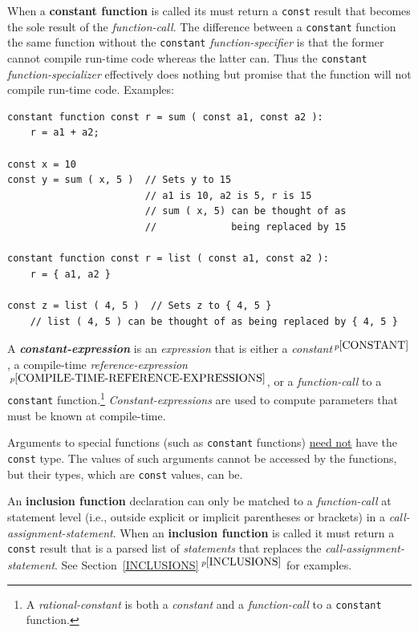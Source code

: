 \documentclass[12pt]{article}
\newcommand{\key}[1]{{\rm \bfseries #1}}
\newcommand{\emkey}[1]{{\em \bfseries #1}}
\newcommand{\itemref}[1]{\ref{#1}$\,^{p\pageref{#1}}$}
\newcommand{\pagnote}[1]{$\,^{p\pageref{#1}}$}
\newenvironment{indpar}[1][0.3in]%
	{\begin{list}{}%
		     {\setlength{\itemsep}{0in}%
		      \setlength{\topsep}{0in}%
		      \setlength{\parsep}{1ex}%
		      \setlength{\labelwidth}{#1}%
		      \setlength{\leftmargin}{#1}%
		      \addtolength{\leftmargin}{\labelsep}}%
	 \item}%
	{\end{list}}
\begin{document}
When a \key{constant function}\label{CONSTANT-FUNCTION} is called
its must return a {\tt const} result that becomes the sole
result of the {\em function-call}.  The difference between a
{\tt constant} function the same function without the {\tt constant}
{\em function-specifier} is that the former cannot compile run-time code
whereas the latter can.
Thus the {\tt constant} {\em function-specializer} effectively does nothing
but promise that the function will not compile run-time code.
Examples:
\begin{indpar}\begin{verbatim}
constant function const r = sum ( const a1, const a2 ):
    r = a1 + a2;

const x = 10
const y = sum ( x, 5 )  // Sets y to 15
                        // a1 is 10, a2 is 5, r is 15
                        // sum ( x, 5) can be thought of as
                        //             being replaced by 15

constant function const r = list ( const a1, const a2 ):
    r = { a1, a2 }

const z = list ( 4, 5 )  // Sets z to { 4, 5 }
    // list ( 4, 5 ) can be thought of as being replaced by { 4, 5 }
\end{verbatim}\end{indpar}


A \emkey{constant-expression}\label{CONSTANT-EXPRESSION}
is an {\em expression} that is either
a {\em constant}\pagnote{CONSTANT}, a compile-time
{\em refer\-ence-expression}\pagnote{COMPILE-TIME-REFERENCE-EXPRESSIONS},
or a {\em function-call} to a {\tt constant} function.\footnote{
A {\em rational-constant} is both a {\em constant} and a {\em function-call}
to a {\tt constant} function.}
{\em Constant-expressions} are used to compute parameters that must be
known at compile-time.

Arguments to special functions (such as {\tt constant} functions)
\underline{need not} have the {\tt const}
type.  The values of such arguments cannot be accessed by the functions,
but their types, which are {\tt const} values, can be.

An \key{inclusion function} declaration can only be matched to
a {\em function-call} at statement level (i.e., outside explicit or implicit
parentheses or brackets) in a {\em call-assign\-ment-statement}.
When an \key{inclusion function} is called it must return a {\tt const} result
that is a parsed list of {\em statements} that replaces
the {\em call-assignment-statement}.
See Section~\itemref{INCLUSIONS} for examples.
\end{document}
